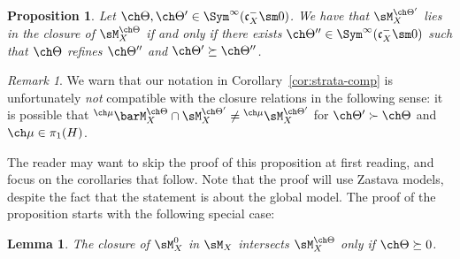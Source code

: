 \documentclass[final]{amsart}
\newtheorem{lem}[subsubsection]{Lemma}
\newtheorem{prop}[subsubsection]{Proposition}
\theoremstyle{remark}
\newtheorem{rem}[subsubsection]{Remark}
\theoremstyle{definition}
\numberwithin{equation}{section}
\begin{document}
\begin{prop} \label{prop:closure-rel}
Let $\ch\Theta,\ch\Theta' \in \Sym^\infty(\mathfrak c_X^- \sm 0)$. 
We have that $\sM^{\ch\Theta'}_X$ lies in the closure of $\sM^{\ch\Theta}_X$
if and only if there exists $\ch\Theta'' \in \Sym^\infty(\mathfrak c_X^-\sm 0)$ such that $\ch\Theta$ refines $\ch\Theta''$ and $\ch\Theta' \succeq \ch\Theta''$. 
\end{prop}

\begin{rem}
We warn that our notation in Corollary~\ref{cor:strata-comp} is unfortunately 
\emph{not} compatible
with the closure relations in the following sense: 
it is possible that $^{\ch\mu} \barM^{\ch\Theta}_X \cap \sM^{\ch\Theta'}_X 
\ne {^{\ch\mu}\sM^{\ch\Theta'}_X}$ for $\ch\Theta' \succ \ch\Theta$ 
and $\ch\mu \in \pi_1(H)$.
\end{rem}



The reader may want to skip the proof of this proposition at first reading, and focus on the corollaries that follow. Note that the proof will use Zastava models, despite the fact that the statement is about the global model. The proof of the proposition starts with the following special case:


\begin{lem} \label{lem:M0closure}
The closure of $\sM_X^0$ in $\sM_X$ intersects 
$\sM_X^{\ch\Theta}$ only if $\ch\Theta \succeq 0$. 
\end{lem}
\end{document}
